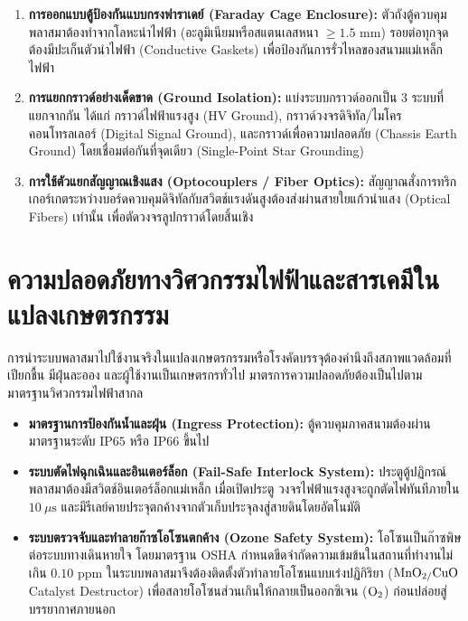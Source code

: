 \begin{enumerate}
    \item \textbf{การออกแบบตู้ป้องกันแบบกรงฟาราเดย์ (Faraday Cage Enclosure):} ตัวถังตู้ควบคุมพลาสมาต้องทำจากโลหะนำไฟฟ้า (อะลูมิเนียมหรือสแตนเลสหนา $\ge 1.5 \text{ mm}$) รอยต่อทุกจุดต้องมีปะเก็นตัวนำไฟฟ้า (Conductive Gaskets) เพื่อป้องกันการรั่วไหลของสนามแม่เหล็กไฟฟ้า
    \item \textbf{การแยกกราวด์อย่างเด็ดขาด (Ground Isolation):} แบ่งระบบกราวด์ออกเป็น 3 ระบบที่แยกจากกัน ได้แก่ กราวด์ไฟฟ้าแรงสูง (HV Ground), กราวด์วงจรดิจิทัล/ไมโครคอนโทรลเลอร์ (Digital Signal Ground), และกราวด์เพื่อความปลอดภัย (Chassis Earth Ground) โดยเชื่อมต่อกันที่จุดเดียว (Single-Point Star Grounding)
    \item \textbf{การใช้ตัวแยกสัญญาณเชิงแสง (Optocouplers / Fiber Optics):} สัญญาณสั่งการทริกเกอร์เกตระหว่างบอร์ดควบคุมดิจิทัลกับสวิตช์แรงดันสูงต้องส่งผ่านสายใยแก้วนำแสง (Optical Fibers) เท่านั้น เพื่อตัดวงจรลูปกราวด์โดยสิ้นเชิง
\end{enumerate}

\section{ความปลอดภัยทางวิศวกรรมไฟฟ้าและสารเคมีในแปลงเกษตรกรรม}

การนำระบบพลาสมาไปใช้งานจริงในแปลงเกษตรกรรมหรือโรงคัดบรรจุต้องคำนึงถึงสภาพแวดล้อมที่เปียกชื้น มีฝุ่นละออง และผู้ใช้งานเป็นเกษตรกรทั่วไป มาตรการความปลอดภัยต้องเป็นไปตามมาตรฐานวิศวกรรมไฟฟ้าสากล

\begin{itemize}
    \item \textbf{มาตรฐานการป้องกันน้ำและฝุ่น (Ingress Protection):} ตู้ควบคุมภาคสนามต้องผ่านมาตรฐานระดับ $\text{IP65}$ หรือ $\text{IP66}$ ขึ้นไป
    \item \textbf{ระบบตัดไฟฉุกเฉินและอินเตอร์ล็อก (Fail-Safe Interlock System):} ประตูตู้ปฏิกรณ์พลาสมาต้องมีสวิตช์อินเตอร์ล็อกแม่เหล็ก เมื่อเปิดประตู วงจรไฟฟ้าแรงสูงจะถูกตัดไฟทันทีภายใน $10 \ \mu\text{s}$ และมีรีเลย์คายประจุตกค้างจากตัวเก็บประจุลงสู่สายดินโดยอัตโนมัติ
    \item \textbf{ระบบตรวจจับและทำลายก๊าซโอโซนตกค้าง (Ozone Safety System):} โอโซนเป็นก๊าซพิษต่อระบบทางเดินหายใจ โดยมาตรฐาน OSHA กำหนดขีดจำกัดความเข้มข้นในสถานที่ทำงานไม่เกิน $0.10 \text{ ppm}$ ในระบบพลาสมาจึงต้องติดตั้งตัวทำลายโอโซนแบบเร่งปฏิกิริยา ($\ce{MnO2/CuO}$ Catalyst Destructor) เพื่อสลายโอโซนส่วนเกินให้กลายเป็นออกซิเจน ($\ce{O2}$) ก่อนปล่อยสู่บรรยากาศภายนอก
\end{itemize}

